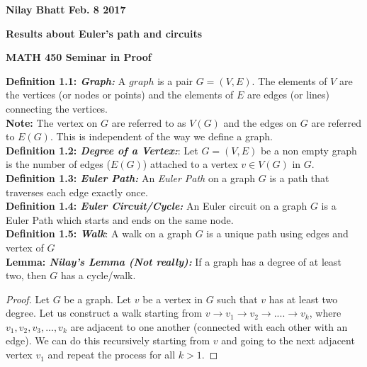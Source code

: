 \documentclass[12pt, fullpage]{article}
\begin{document}
\begin{flushleft}
\textbf{Nilay Bhatt Feb. 8 2017}		
\end{flushleft}
\begin{center}
	\textbf{Results about Euler's path and circuits}
\end{center}
\begin{center}
		
{\bf MATH 450 Seminar in Proof}
 \\
\end{center}
\textbf{Definition 1.1: \textit{Graph: }}A $graph$ is a pair $G = (V,E)$. The elements of $V$ are the vertices (or nodes or points) and the elements of $E$ are edges (or lines) connecting the vertices.\\

\textbf{Note:}	The vertex on $G$ are referred to as $V(G)$ and the edges on $G$ are referred to $E(G)$. This is independent of the way we define a graph.\\

\textbf{Definition 1.2: \textit{Degree of a Vertex:}}: Let $G = (V,E)$ be a non empty graph is the number of edges ($E(G)$) attached to a vertex $v \in V(G)$ in $G$.\\

\textbf{Definition 1.3: \textit{Euler Path: }}An \textit{Euler Path} on a graph $G$ is a path that traverses each edge exactly once.\\

\textbf{Definition 1.4: \textit{Euler Circuit/Cycle: }}An Euler circuit on a graph $G$ is a Euler Path which starts and ends on the same node.\\

\textbf{Definition 1.5: \textit{Walk}}: A walk on a graph $G$ is a unique path using edges and vertex of $G$\\

\textbf{Lemma: \textit{Nilay's Lemma (Not really):}} If a graph has a degree of at least two, then $G$ has a cycle/walk.
\begin{proof}

Let $G$ be a graph. Let $v$ be a vertex in $G$ such that $v$ has at least two degree. Let us construct a walk starting from $v \rightarrow v_1 \rightarrow v_2 \rightarrow ....\rightarrow v_k$, where $v_1, v_2, v_3, ... , v_k$ are adjacent to one another (connected with each other with an edge). We can do this recursively starting from $v$ and going to the next adjacent vertex $v_1$ and repeat the process for all $k>1$.
\end{proof}
\end{document}
